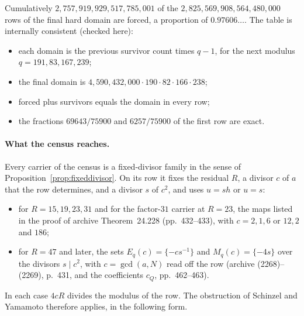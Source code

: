 Cumulatively $2{,}757{,}919{,}929{,}517{,}785{,}001$ of the $2{,}825{,}569{,}908{,}564{,}480{,000}$ rows of the final hard domain are forced, a proportion of $0.97606\ldots$.
The table is internally consistent (checked here):
\begin{itemize}
\item each domain is the previous survivor count times $q-1$, for the next modulus $q=191,83,167,239$;
\item the final domain is $4{,}590{,}432{,}000\cdot190\cdot82\cdot166\cdot238$;
\item forced plus survivors equals the domain in every row;
\item the fractions $69643/75900$ and $6257/75900$ of the first row are exact.
\end{itemize}


\paragraph{What the census reaches.}
Every carrier of the census is a fixed-divisor family in the sense of Proposition~\ref{prop:fixeddivisor}. On its row it fixes the residual $R$, a divisor $c$ of $a$ that the row determines, and a divisor $s$ of $c^2$, and uses $u=sh$ or $u=s$:
\begin{itemize}
\item for $R=15,19,23,31$ and for the factor-$31$ carrier at $R=23$, the maps listed in the proof of archive Theorem~24.228 (pp.~432--433), with $c=2,1,6$ or $12,2$ and $186$;
\item for $R=47$ and later, the sets $E_q(c)=\{-cs^{-1}\}$ and $M_q(c)=\{-4s\}$ over the divisors $s\mid c^2$, with $c=\gcd(a,N)$ read off the row (archive (2268)--(2269), p.~431, and the coefficients $c_Q$, pp.~462--463).
\end{itemize}
In each case $4cR$ divides the modulus of the row. The obstruction of Schinzel and Yamamoto therefore applies, in the following form.

